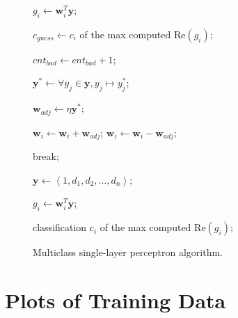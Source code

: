 \documentclass[twoside]{IEEEtran}
\begin{document}
\begin{figure}[!t]
\begin{algorithm}[H]
\begin{algorithmic}
                        \State%
                        \( g_i \gets \mathbf{w}_i^T \mathbf{y} \);
                    \EndFor%

                    \State%
                    \( c_{guess} \gets c_i \) of the max computed \( \mathrm{Re}\left(g_i\right) \);

                        \State%
                        \( cnt_{bad} \gets cnt_{bad} + 1 \);

                        \State%
                        \( \mathbf{y}^* \gets \forall y_j \in \mathbf{y}, y_j \mapsto y_j^* \);

                        \State%
                        \( \mathbf{w}_{adj} \gets \eta \mathbf{y}^* \);


                                \State%
                                \( \mathbf{w}_i \gets \mathbf{w}_i + \mathbf{w}_{adj} \);
                            \Else%
                                \State%
                                \( \mathbf{w}_i \gets \mathbf{w}_i - \mathbf{w}_{adj} \);
                            \EndIf%
                        \EndFor%
                    \EndIf%
                \EndFor%

                    \State%
                    break;
                \EndIf%
            \EndFor%

            \State{}
                \State%
                \( \mathbf{y} \gets \left<1, d_1, d_2, \dots, d_n \right> \);

                \State%
                \( g_i \gets \mathbf{w}_i^T \mathbf{y} \);
            \EndFor%

            \State\Return%
            classification \( c_i \) of the max computed \( \mathrm{Re}\left(g_i\right) \);
        \end{algorithmic}
    \end{algorithm}

    \caption{Multiclass single-layer perceptron algorithm.}%
    \label{slp}
\end{figure}

\section{Plots of Training Data}%
\label{train_data_plots}
\end{document}
